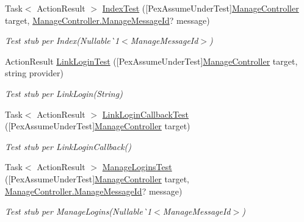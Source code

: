 \begin{DoxyCompactItemize}
Task$<$ Action\+Result $>$ \mbox{\hyperlink{class_brew_day2_1_1_tests_1_1_manage_controller_test_a2a386a49ae6bce6c7efc13232132479e}{Index\+Test}} (\mbox{[}Pex\+Assume\+Under\+Test\mbox{]}\mbox{\hyperlink{class_brew_day2_1_1_controllers_1_1_manage_controller}{Manage\+Controller}} target, \mbox{\hyperlink{class_brew_day2_1_1_controllers_1_1_manage_controller_a418038dc90e9d94606f474b9c06fd8c8}{Manage\+Controller.\+Manage\+Message\+Id}}? message)
\begin{DoxyCompactList}\small\item\em Test stub per Index(Nullable\`{}1$<$Manage\+Message\+Id$>$)\end{DoxyCompactList}\item 
Action\+Result \mbox{\hyperlink{class_brew_day2_1_1_tests_1_1_manage_controller_test_a0963c0cc77b8761bff78c6bc059b1fe4}{Link\+Login\+Test}} (\mbox{[}Pex\+Assume\+Under\+Test\mbox{]}\mbox{\hyperlink{class_brew_day2_1_1_controllers_1_1_manage_controller}{Manage\+Controller}} target, string provider)
\begin{DoxyCompactList}\small\item\em Test stub per Link\+Login(\+String)\end{DoxyCompactList}\item 
Task$<$ Action\+Result $>$ \mbox{\hyperlink{class_brew_day2_1_1_tests_1_1_manage_controller_test_ad420c0783462e22703c44b9cc185f1aa}{Link\+Login\+Callback\+Test}} (\mbox{[}Pex\+Assume\+Under\+Test\mbox{]}\mbox{\hyperlink{class_brew_day2_1_1_controllers_1_1_manage_controller}{Manage\+Controller}} target)
\begin{DoxyCompactList}\small\item\em Test stub per Link\+Login\+Callback()\end{DoxyCompactList}\item 
Task$<$ Action\+Result $>$ \mbox{\hyperlink{class_brew_day2_1_1_tests_1_1_manage_controller_test_a89af4fcd07b84c3a72d78cd65566e8e0}{Manage\+Logins\+Test}} (\mbox{[}Pex\+Assume\+Under\+Test\mbox{]}\mbox{\hyperlink{class_brew_day2_1_1_controllers_1_1_manage_controller}{Manage\+Controller}} target, \mbox{\hyperlink{class_brew_day2_1_1_controllers_1_1_manage_controller_a418038dc90e9d94606f474b9c06fd8c8}{Manage\+Controller.\+Manage\+Message\+Id}}? message)
\begin{DoxyCompactList}\small\item\em Test stub per Manage\+Logins(Nullable\`{}1$<$Manage\+Message\+Id$>$)\end{DoxyCompactList}\item 

\end{DoxyCompactItemize}
